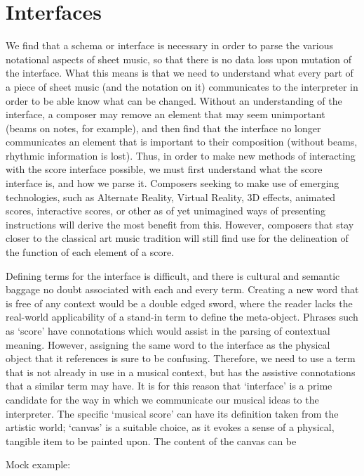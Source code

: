 \section{Interfaces}
We find that a schema or interface is necessary in order to parse the various notational aspects of sheet music, so that there is no data loss upon mutation of the interface.
What this means is that we need to understand what every part of a piece of sheet music (and the notation on it) communicates to the interpreter in order to be able know what can be changed.
Without an understanding of the interface, a composer may remove an element that may seem unimportant (beams on notes, for example), and then find that the interface no longer communicates an element that is important to their composition (without beams, rhythmic information is lost).
Thus, in order to make new methods of interacting with the score interface possible, we must first understand what the score interface is, and how we parse it.
Composers seeking to make use of emerging technologies, such as Alternate Reality, Virtual Reality, 3D effects, animated scores, interactive scores, or other as of yet unimagined ways of presenting instructions will derive the most benefit from this.
However, composers that stay closer to the classical art music tradition will still find use for the delineation of the function of each element of a score.

Defining terms for the interface is difficult, and there is cultural and semantic baggage no doubt associated with each and every term.
Creating a new word that is free of any context would be a double edged sword, where the reader lacks the real-world applicability of a stand-in term to define the meta-object.
Phrases such as `score' have connotations which would assist in the parsing of contextual meaning. 
However, assigning the same word to the interface as the physical object that it references is sure to be confusing.
Therefore, we need to use a term that is not already in use in a musical context, but has the assistive connotations that a similar term may have. 
It is for this reason that `interface' is a prime candidate for the way in which we communicate our musical ideas to the interpreter. 
The specific `musical score' can have its definition taken from the artistic world; `canvas' is a suitable choice, as it evokes a sense of a physical, tangible item to be painted upon.
The content of the canvas can be 

Mock example: 

%             




